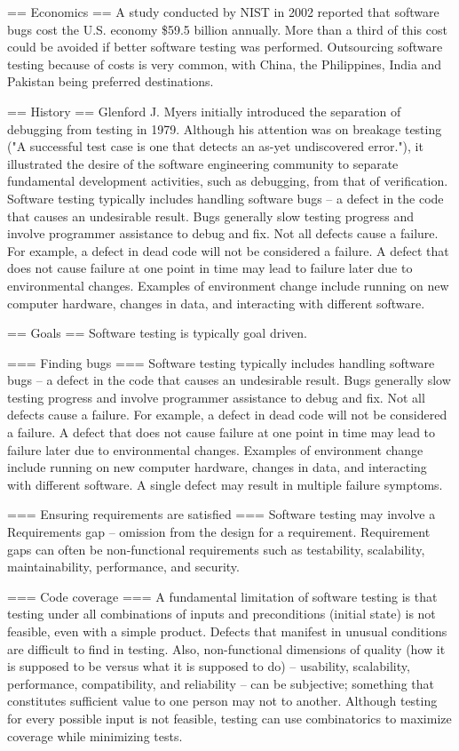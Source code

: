 == Economics ==
A study conducted by NIST in 2002 reported that software bugs cost the U.S. economy \$59.5 billion annually. More than a third of this cost could be avoided if better software testing was performed.
Outsourcing software testing because of costs is very common, with China, the Philippines, India and Pakistan being preferred destinations.


== History ==
Glenford J. Myers initially introduced the separation of debugging from testing in 1979. Although his attention was on breakage testing ("A successful test case is one that detects an as-yet undiscovered error."), it illustrated the desire of the software engineering community to separate fundamental development activities, such as debugging, from that of verification.
Software testing typically includes handling software bugs – a defect in the code that causes an undesirable result. Bugs generally slow testing progress and involve programmer assistance to debug and fix.
Not all defects cause a failure. For example, a defect in dead code will not be considered a failure.
A defect that does not cause failure at one point in time may lead to failure later due to environmental changes. Examples of environment change include running on new computer hardware, changes in data, and interacting with different software.


== Goals ==
Software testing is typically goal driven.


=== Finding bugs ===
Software testing typically includes handling software bugs – a defect in the code that causes an undesirable result. Bugs generally slow testing progress and involve programmer assistance to debug and fix.
Not all defects cause a failure. For example, a defect in dead code will not be considered a failure.
A defect that does not cause failure at one point in time may lead to failure later due to environmental changes. Examples of environment change include running on new computer hardware, changes in data, and interacting with different software.
A single defect may result in multiple failure symptoms.


=== Ensuring requirements are satisfied ===
Software testing may involve a Requirements gap – omission from the design for a requirement. Requirement gaps can often be non-functional requirements such as testability, scalability, maintainability, performance, and security.


=== Code coverage ===
A fundamental limitation of software testing is that testing under all combinations of inputs and preconditions (initial state) is not feasible, even with a simple product. 
Defects that manifest in unusual conditions are difficult to find in testing. Also, non-functional dimensions of quality (how it is supposed to be versus what it is supposed to do) – usability, scalability, performance, compatibility, and reliability – can be subjective; something that constitutes sufficient value to one person may not to another.
Although testing for every possible input is not feasible, testing can use combinatorics to maximize coverage while minimizing tests.


